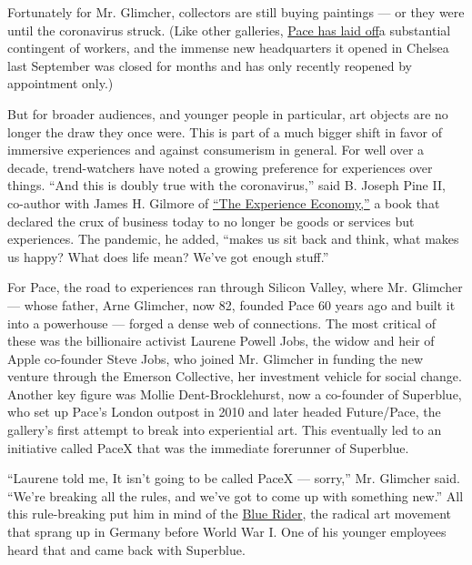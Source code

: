 Fortunately for Mr. Glimcher, collectors are still buying paintings ---
or they were until the coronavirus struck. (Like other galleries,
\href{https://www.artnews.com/art-news/news/pace-gallery-lay-offs-1202695286/}{Pace
has laid off}a substantial contingent of workers, and the immense new
headquarters it opened in Chelsea last September was closed for months
and has only recently reopened by appointment only.)

But for broader audiences, and younger people in particular, art objects
are no longer the draw they once were. This is part of a much bigger
shift in favor of immersive experiences and against consumerism in
general. For well over a decade, trend-watchers have noted a growing
preference for experiences over things. ``And this is doubly true with
the coronavirus,'' said B. Joseph Pine II, co-author with James H.
Gilmore of
\href{https://www.google.com/books/edition/The_Experience_Economy/5hs-tyRrSXMC?hl=en\&gbpv=0\&kptab=getbook}{``The
Experience Economy,''} a book that declared the crux of business today
to no longer be goods or services but experiences. The pandemic, he
added, ``makes us sit back and think, what makes us happy? What does
life mean? We've got enough stuff.''

For Pace, the road to experiences ran through Silicon Valley, where Mr.
Glimcher --- whose father, Arne Glimcher, now 82, founded Pace 60 years
ago and built it into a powerhouse --- forged a dense web of
connections. The most critical of these was the billionaire activist
Laurene Powell Jobs, the widow and heir of Apple co-founder Steve Jobs,
who joined Mr. Glimcher in funding the new venture through the Emerson
Collective, her investment vehicle for social change. Another key figure
was Mollie Dent-Brocklehurst, now a co-founder of Superblue, who set up
Pace's London outpost in 2010 and later headed Future/Pace, the
gallery's first attempt to break into experiential art. This eventually
led to an initiative called PaceX that was the immediate forerunner of
Superblue.

``Laurene told me, It isn't going to be called PaceX --- sorry,'' Mr.
Glimcher said. ``We're breaking all the rules, and we've got to come up
with something new.'' All this rule-breaking put him in mind of the
\href{https://www.nytimes.com/2018/10/24/arts/design/franz-marc-august-macke-neue-galerie.html}{Blue
Rider}, the radical art movement that sprang up in Germany before World
War I. One of his younger employees heard that and came back with
Superblue.

